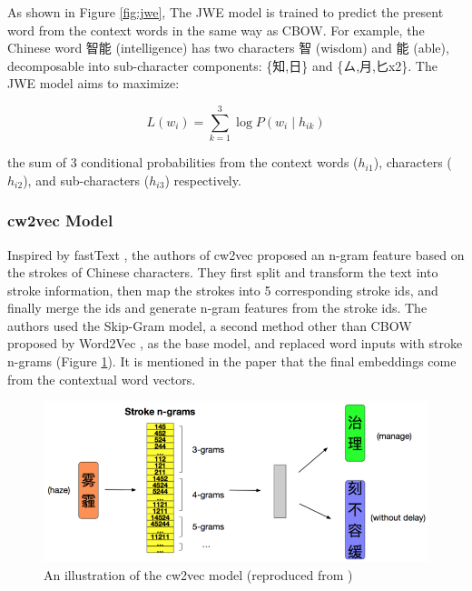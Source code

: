 As shown in Figure \ref{fig:jwe}, The JWE model is trained to predict the present word from the context words in the same way as CBOW. For example, the Chinese word 智能 (intelligence) has two characters 智 (wisdom) and 能 (able), decomposable into sub-character components: \{知,日\} and \{ㄙ,月,匕x2\}. The JWE model aims to maximize:

\begin{equation*}
L(w_i) = \sum_{k=1}^3\log P(w_i\mid h_{ik})
\end{equation*}

the sum of 3 conditional probabilities from the context words ($h_{i1}$), characters ($h_{i2}$), and sub-characters ($h_{i3}$) respectively.

\subsubsection{cw2vec Model}

Inspired by fastText \cite{bojanowski2017enriching}, the authors of cw2vec \cite{cao2018cw2vec} proposed an n-gram feature based on the strokes of Chinese characters. They first split and transform the text into stroke information, then map the strokes into 5 corresponding stroke ids, and finally merge the ids and generate n-gram features from the stroke ids. The authors used the Skip-Gram model, a second method other than CBOW proposed by Word2Vec \cite{mikolov2013efficient}, as the base model, and replaced word inputs with stroke n-grams (Figure \ref{fig:cw2vec}). It is mentioned in the paper that the final embeddings come from the contextual word vectors.

\vspace{0.3cm}

\begin{figure}[h]
	\centering
	\includegraphics[scale=0.55]{../images/cw2vec_illustration2.png}
	\caption{An illustration of the cw2vec model (reproduced from \cite{cao2018cw2vec})}
	\label{fig:cw2vec}
\end{figure}

